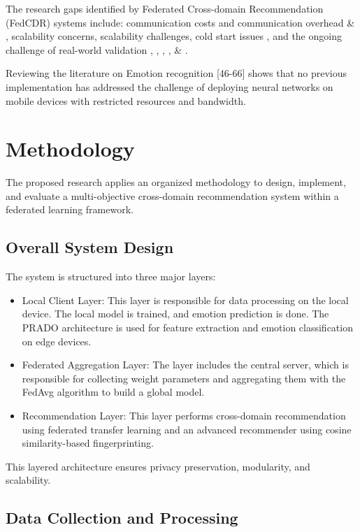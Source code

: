 The research gaps identified by Federated Cross-domain Recommendation (FedCDR) systems include: communication costs and communication overhead \cite{ref43} \& \cite{ref44} , scalability concerns, scalability challenges, cold start issues \cite{ref45}, and the ongoing challenge of real-world validation \cite{ref46}, \cite{ref47}, \cite{ref48} , \cite{ref49}, \& \cite{ref8}.

Reviewing the literature on Emotion recognition [46-66] shows that no previous implementation has addressed the challenge of deploying neural networks on mobile devices with restricted resources and bandwidth.

\section{Methodology}
The proposed research applies an organized methodology to design, implement, and evaluate a multi-objective cross-domain recommendation system within a federated learning framework.

\subsection{Overall System Design}
The system is structured into three major layers:

\begin{itemize}
    \item Local Client Layer: This layer is responsible for data processing on the local device. The local model is trained, and emotion prediction is done. The PRADO architecture is used for feature extraction and emotion classification on edge devices.
    \item Federated Aggregation Layer: The layer includes the central server, which is responsible for collecting weight parameters and aggregating them with the FedAvg algorithm to build a global model.
    \item Recommendation Layer: This layer performs cross-domain recommendation using federated transfer learning and an advanced recommender using cosine similarity-based fingerprinting.
\end{itemize}

This layered architecture ensures privacy preservation, modularity, and scalability.

\subsection{Data Collection and Processing}
